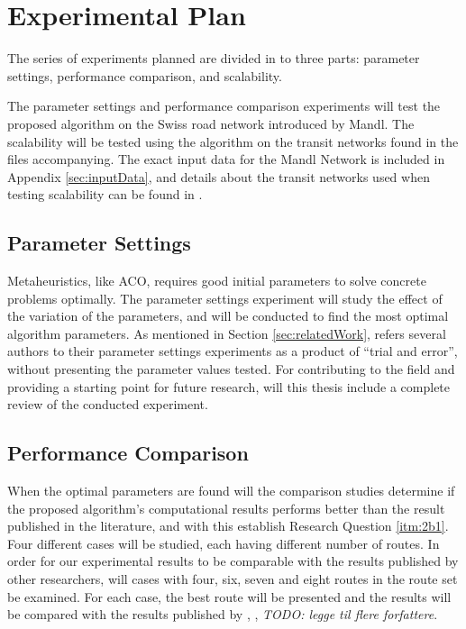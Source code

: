 \section{Experimental Plan}
\label{sec:expPlan}
The series of experiments planned are divided in to three parts: parameter settings, performance comparison, and scalability.

The parameter settings and performance comparison experiments will test the proposed algorithm on the Swiss road network introduced by Mandl\citep{mandl79}. The scalability will be tested using the algorithm on the transit networks found in the files accompanying\citet{mumford13}. The exact input data for the Mandl Network is included in Appendix \vref{sec:inputData}, and details about the transit networks used when testing scalability can be found in \citet{mumford13}.

\subsection{Parameter Settings}
Metaheuristics, like ACO, requires good initial parameters to solve concrete problems optimally. The parameter settings experiment will study the effect of the variation of the parameters, and will be conducted to find the most optimal algorithm parameters. As mentioned in Section \vref{sec:relatedWork}, refers several authors to their parameter settings experiments as a product of ``trial and error'', without presenting the parameter values tested. For contributing to the field and providing a starting point for future research, will this thesis include a complete review of the conducted experiment. %

\subsection{Performance Comparison}
When the optimal parameters are found will the comparison studies determine if the proposed algorithm's computational results performs better than the result published in the literature, and with this establish Research Question \ref{itm:2b1}. Four different cases will be studied, each having different number of routes. In order for our experimental results to be comparable with the results published by other researchers, will cases with four, six, seven and eight routes in the route set be examined. For each case, the best route will be presented and the results will be compared with the results published by \citet{kechagiopoulos14}, \citet{mandl79}, \citet{fan09} \emph{\color{blue} TODO: legge til flere forfattere}. 

